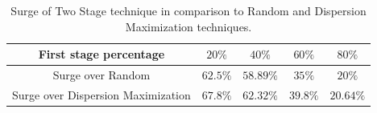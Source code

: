 \documentclass{acm_proc_article-sp}
\begin{document}
\begin{table}[!h]
\centering
\begin{tabulary}{0.5\textwidth}{|C|C|C|C|C|}
\hline
First stage percentage & $20\%$ & $40\%$  & $60\%$  & $80\%$  \\ \hline
Surge over Random   & $62.5\%$ & $58.89\%$  & $35\%$  & $20\%$  \\ \hline
Surge over Dispersion Maximization   & $67.8\%$ & $62.32\%$  & $39.8\%$  & $20.64\%$ \\ \hline
\end{tabulary}
\caption{Surge of Two Stage technique in comparison to Random and Dispersion Maximization techniques.}
\label{table:clusteredSurge}
\end{table}
\end{document}

